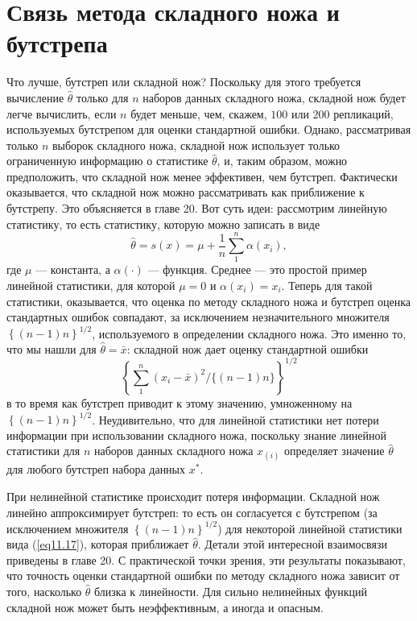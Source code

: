 \section{Связь метода складного ножа и бутстрепа}

Что лучше, бутстреп или складной нож? Поскольку для этого требуется вычисление $\hat{\theta}$ только для $n$ наборов данных складного ножа, складной нож будет легче вычислить, если $n$ будет меньше, чем, скажем, $100$ или $200$ репликаций, используемых бутстрепом для оценки стандартной ошибки. Однако, рассматривая только $n$ выборок складного ножа, складной нож использует только ограниченную информацию о статистике $\hat{\theta}$, и, таким образом, можно предположить, что складной нож менее эффективен, чем бутстреп. Фактически оказывается, что складной нож можно рассматривать как приближение к бутстрепу. Это объясняется в главе 20. Вот суть идеи: рассмотрим линейную статистику, то есть статистику, которую можно записать в виде
\begin{equation}\label{eq11.17}
    \hat{\theta} = s(x) = \mu + \frac{1}{n}\sum\limits_{1}^{n}\alpha(x_{i}),
\end{equation}
где $\mu$ --- константа, а $\alpha(\cdot)$ --- функция. Среднее --- это простой пример линейной статистики, для которой $\mu = 0$ и $\alpha(x_i) = x_i$. Теперь для такой статистики, оказывается, что оценка по методу складного ножа и бутстреп оценка стандартных ошибок совпадают, за исключением незначительного множителя $\left\{(n-1)n\right\}^{1/2}$, используемого в определении складного ножа. Это именно то, что мы нашли для $\hat{\theta} = \bar{x}$: складной нож дает оценку стандартной ошибки $$\left\{\sum\limits_{1}^{n}(x_{i} - \bar{x})^2/\{(n-1)n\}\right\}^{1/2}$$ в то время как бутстреп приводит к этому значению, умноженному на $\left\{(n-1)n\right\}^{1/2}$. Неудивительно, что для линейной статистики нет потери информации при использовании складного ножа, поскольку знание линейной статистики для $n$ наборов данных складного ножа $x_{(i)}$ определяет значение $\hat{\theta}$ для любого бутстреп набора данных $x^{*}$.

При нелинейной статистике происходит потеря информации. Складной нож линейно аппроксимирует бутстреп: то есть он согласуется с бутстрепом (за исключением множителя $\left\{(n-1)n\right\}^{1/2}$) для некоторой линейной статистики вида (\ref{eq11.17}), которая приближает $\hat{\theta}$. Детали этой интересной взаимосвязи приведены в главе 20. С практической точки зрения, эти результаты показывают, что точность оценки стандартной ошибки по методу складного ножа зависит от того, насколько $\hat{\theta}$ близка к линейности. Для сильно нелинейных функций складной нож может быть неэффективным, а иногда и опасным.

